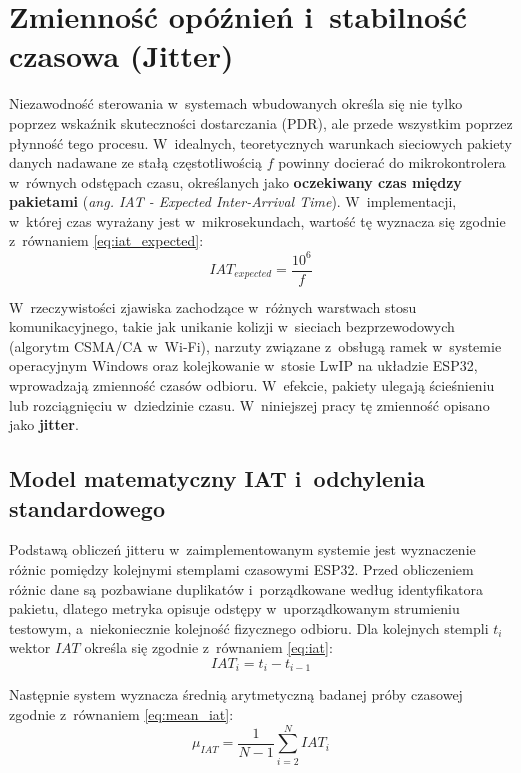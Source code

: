 \section{Zmienność opóźnień i~stabilność czasowa (Jitter)}
\label{sec:jitter}

Niezawodność sterowania w~systemach wbudowanych określa się nie tylko poprzez wskaźnik skuteczności dostarczania (PDR), ale przede wszystkim poprzez płynność tego procesu.
W~idealnych, teoretycznych warunkach sieciowych pakiety danych nadawane ze stałą częstotliwością $f$ powinny docierać do mikrokontrolera w~równych odstępach czasu, określanych jako \textbf{oczekiwany czas między pakietami} (\textit{ang. IAT - Expected Inter-Arrival Time}).
W~implementacji, w~której czas wyrażany jest w~mikrosekundach, wartość tę wyznacza się zgodnie z~równaniem \ref{eq:iat_expected}:
\begin{equation}
    IAT_{expected} = \frac{10^6}{f}
    \label{eq:iat_expected}
\end{equation}

W~rzeczywistości zjawiska zachodzące w~różnych warstwach stosu komunikacyjnego, takie jak unikanie kolizji w~sieciach bezprzewodowych (algorytm CSMA/CA w~Wi-Fi), narzuty związane z~obsługą ramek w~systemie operacyjnym Windows oraz kolejkowanie w~stosie LwIP na układzie ESP32, wprowadzają zmienność czasów odbioru.
W~efekcie, pakiety ulegają ścieśnieniu lub rozciągnięciu w~dziedzinie czasu.
W~niniejszej pracy tę zmienność opisano jako \textbf{jitter}.

\subsection{Model matematyczny IAT i~odchylenia standardowego}
Podstawą obliczeń jitteru w~zaimplementowanym systemie jest wyznaczenie różnic pomiędzy kolejnymi stemplami czasowymi ESP32.
Przed obliczeniem różnic dane są pozbawiane duplikatów i~porządkowane według identyfikatora pakietu, dlatego metryka opisuje odstępy w~uporządkowanym strumieniu testowym, a~niekoniecznie kolejność fizycznego odbioru.
Dla kolejnych stempli $t_i$ wektor $IAT$ określa się zgodnie z~równaniem \ref{eq:iat}:
\begin{equation}
    IAT_i = t_i - t_{i-1}
    \label{eq:iat}
\end{equation}

Następnie system wyznacza średnią arytmetyczną badanej próby czasowej zgodnie z~równaniem \ref{eq:mean_iat}:
\begin{equation}
    \mu_{IAT} = \frac{1}{N-1} \sum_{i=2}^{N}
    IAT_i \label{eq:mean_iat} \end{equation}

